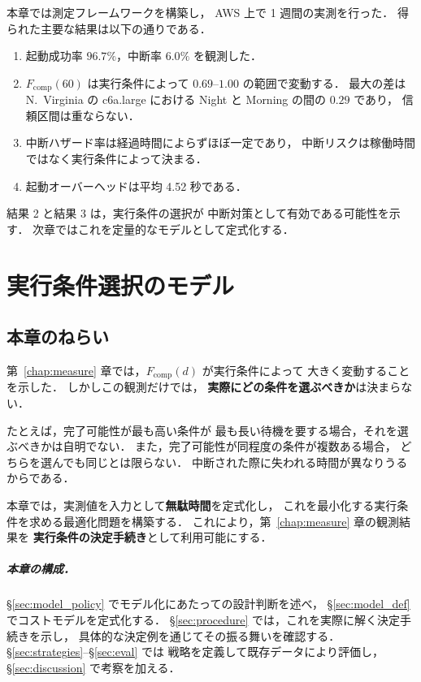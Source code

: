 \documentclass[11pt,a4paper]{ltjsreport}
\newcommand{\Fcomp}{F_{\mathrm{comp}}}
\begin{document}
本章では測定フレームワークを構築し，
AWS 上で 1 週間の実測を行った．
得られた主要な結果は以下の通りである．

\begin{enumerate}
  \item 起動成功率 $96.7\%$，中断率 $6.0\%$ を観測した．
  \item $\Fcomp(60)$ は実行条件によって $0.69$--$1.00$ の範囲で変動する．
        最大の差は N.~Virginia の c6a.large における
        Night と Morning の間の $0.29$ であり，
        信頼区間は重ならない．
  \item 中断ハザード率は経過時間によらずほぼ一定であり，
        中断リスクは稼働時間ではなく実行条件によって決まる．
  \item 起動オーバーヘッドは平均 4.52 秒である．
\end{enumerate}

結果 2 と結果 3 は，実行条件の選択が
中断対策として有効である可能性を示す．
次章ではこれを定量的なモデルとして定式化する．

\chapter{実行条件選択のモデル}
\label{chap:model}

\section{本章のねらい}

第~\ref{chap:measure} 章では，$\Fcomp(d)$ が実行条件によって
大きく変動することを示した．
しかしこの観測だけでは，
\textbf{実際にどの条件を選ぶべきか}は決まらない．

たとえば，完了可能性が最も高い条件が
最も長い待機を要する場合，それを選ぶべきかは自明でない．
また，完了可能性が同程度の条件が複数ある場合，
どちらを選んでも同じとは限らない．
中断された際に失われる時間が異なりうるからである．

本章では，実測値を入力として\textbf{無駄時間}を定式化し，
これを最小化する実行条件を求める最適化問題を構築する．
これにより，第~\ref{chap:measure} 章の観測結果を
\textbf{実行条件の決定手続き}として利用可能にする．

\paragraph{本章の構成．}
\S\ref{sec:model_policy} でモデル化にあたっての設計判断を述べ，
\S\ref{sec:model_def} でコストモデルを定式化する．
\S\ref{sec:procedure} では，これを実際に解く決定手続きを示し，
具体的な決定例を通じてその振る舞いを確認する．
\S\ref{sec:strategies}--\S\ref{sec:eval} では
戦略を定義して既存データにより評価し，
\S\ref{sec:discussion} で考察を加える．
\end{document}
